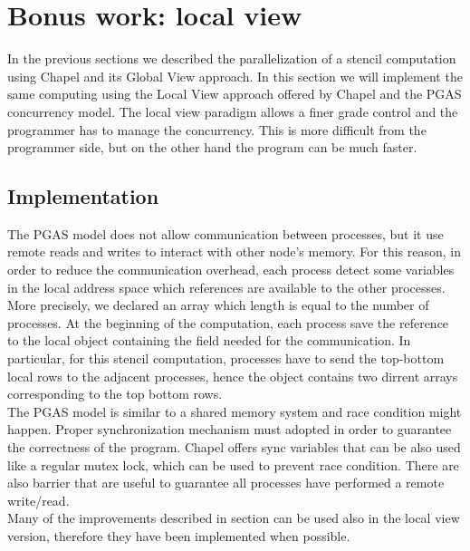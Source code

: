 \documentclass{article}
\begin{document}
\appendix

\section{Bonus work: local view}
In the previous sections we described the parallelization of a stencil computation using Chapel and its Global View approach. In this section we will implement the same computing using the Local View approach offered by Chapel and the PGAS concurrency model. The local view paradigm allows a finer grade control and the programmer has to manage the concurrency. This is more difficult from the programmer side, but on the other hand the program can be much faster.

\subsection{Implementation}
The PGAS model does not allow communication between processes, but it use remote reads and writes to interact with other node's memory. For this reason, in order to reduce the communication overhead, each process detect some variables in the local address space which references are available to the other processes. More precisely, we declared an array which length is equal to the number of processes. At the beginning of the computation, each process save the reference to the local object containing the field needed for the communication. In particular, for this stencil computation, processes have to send the top-bottom local rows to the adjacent processes, hence the object contains two dirrent arrays corresponding to the top bottom rows. \\
The PGAS model is similar to a shared memory system and race condition might happen. Proper synchronization mechanism must adopted in order to guarantee the correctness of the program. Chapel offers sync variables that can be also used like a regular mutex lock, which can be used to prevent race condition. There are also barrier that are useful to guarantee all processes have performed a remote write/read. \\
Many of the improvements described in section  can be used also in the local view version, therefore they have been implemented when possible.
\end{document}
